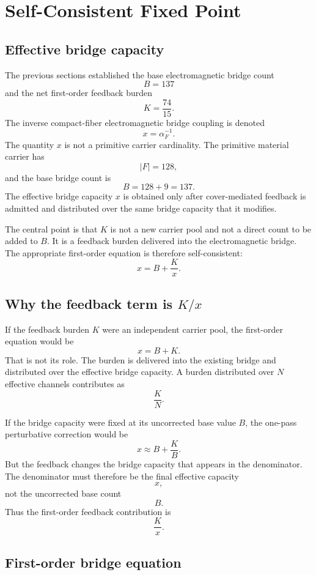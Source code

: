 \section{Self-Consistent Fixed Point}

\subsection{Effective bridge capacity}

The previous sections established the base electromagnetic bridge count
\[
B=137
\]
and the net first-order feedback burden
\[
K=\frac{74}{15}.
\]
The inverse compact-fiber electromagnetic bridge coupling is denoted
\[
x=\alpha_F^{-1}.
\]
The quantity \(x\) is not a primitive carrier cardinality. The primitive material carrier has
\[
|F|=128,
\]
and the base bridge count is
\[
B=128+9=137.
\]
The effective bridge capacity \(x\) is obtained only after cover-mediated feedback is admitted and distributed over the same bridge capacity that it modifies.

The central point is that \(K\) is not a new carrier pool and not a direct count to be added to \(B\). It is a feedback burden delivered into the electromagnetic bridge. The appropriate first-order equation is therefore self-consistent:
\[
x=B+\frac{K}{x}.
\]

\subsection{\texorpdfstring{Why the feedback term is \(K/x\)}{Why the feedback term is K/x}}

If the feedback burden \(K\) were an independent carrier pool, the first-order equation would be
\[
x=B+K.
\]
That is not its role. The burden is delivered into the existing bridge and distributed over the effective bridge capacity. A burden distributed over \(N\) effective channels contributes as
\[
\frac{K}{N}.
\]

If the bridge capacity were fixed at its uncorrected base value \(B\), the one-pass perturbative correction would be
\[
x\approx B+\frac{K}{B}.
\]
But the feedback changes the bridge capacity that appears in the denominator. The denominator must therefore be the final effective capacity
\[
x,
\]
not the uncorrected base count
\[
B.
\]
Thus the first-order feedback contribution is
\[
\frac{K}{x}.
\]

\subsection{First-order bridge equation}

